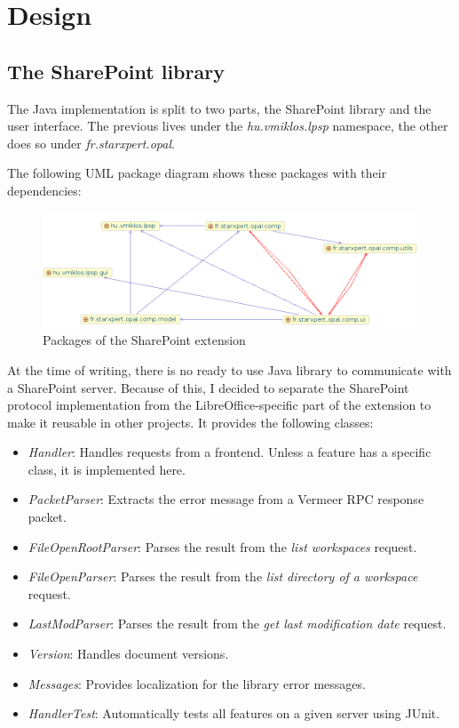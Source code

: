 \section{Design}

\subsection{The SharePoint library}

The Java implementation is split to two parts, the SharePoint library and the
user interface. The previous lives under the \emph{hu.vmiklos.lpsp} namespace,
the other does so under \emph{fr.starxpert.opal}.

The following UML package diagram shows these packages with their dependencies:

\begin{figure}[H]
\centering
\includegraphics[width=425px,keepaspectratio]{design-packages.png}
\caption{Packages of the SharePoint extension}
\end{figure}

At the time of writing, there is no ready to use Java library to communicate
with a SharePoint server. Because of this, I decided to separate the SharePoint
protocol implementation from the LibreOffice-specific part of the extension to
make it reusable in other projects. It provides the following classes:

\begin{itemize}
\item \emph{Handler}: Handles requests from a frontend. Unless a feature has a
specific class, it is implemented here.
\item \emph{PacketParser}: Extracts the error message from a Vermeer
RPC\cite{vermeer} response packet.
\item \emph{FileOpenRootParser}: Parses the result from the \emph{list
workspaces} request.
\item \emph{FileOpenParser}: Parses the result from the \emph{list directory of
a workspace} request.
\item \emph{LastModParser}: Parses the result from the \emph{get last
modification date} request.
\item \emph{Version}: Handles document versions.
\item \emph{Messages}: Provides localization for the library error messages.
\item \emph{HandlerTest}: Automatically tests all features on a given server
using JUnit.
\end{itemize}

